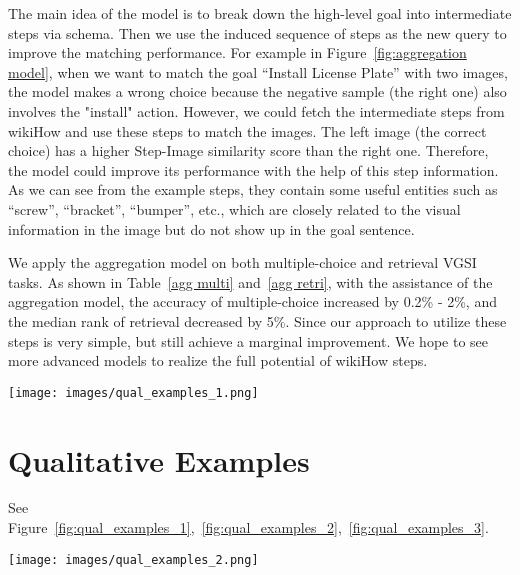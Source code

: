 \documentclass[11pt]{article}
\begin{document}
The main idea of the model is to break down the high-level goal into intermediate steps via schema. Then we use the induced sequence of steps as the new query to improve the matching performance. For example in Figure~\ref{fig:aggregation model}, when we want to match the goal “Install License Plate” with two images, the model makes a wrong choice because the negative sample (the right one) also involves the "install" action. However, we could fetch the intermediate steps from \textcolor{outerspace}{wiki}\textcolor{OLIVINE}{How} and use these steps to match the images. The left image (the correct choice) has a higher Step-Image similarity score than the right one. Therefore, the model could improve its performance with the help of this step information. As we can see from the example steps, they contain some useful entities such as “screw”, “bracket”, “bumper”, etc., which are closely related to the visual information in the image but do not show up in the goal sentence.

We apply the aggregation model on both multiple-choice and retrieval VGSI tasks. As shown in Table~\ref{agg multi} and~\ref{agg retri}, with the assistance of the aggregation model, the accuracy of multiple-choice increased by 0.2\% - 2\%, and the median rank of retrieval decreased by 5\%. Since our approach to utilize these steps is very simple, but still achieve a marginal improvement. We hope to see more advanced models to realize the full potential of wikiHow steps.

\begin{figure*}[!t]
\centering
    \texttt{[image: images/qual\_examples\_1.png]}
    \captionsetup{justification=centering}
    \caption[model]{Qualitative Examples Using Different Sampling Strategies.}
    \label{fig:qual_examples_1}
\end{figure*}


\newpage

\section{Qualitative Examples}

See Figure~\ref{fig:qual_examples_1},~\ref{fig:qual_examples_2},~\ref{fig:qual_examples_3}.
\begin{figure*}[!t]
\centering
    \texttt{[image: images/qual\_examples\_2.png]}
\caption[model]{Qualitative Examples Using Different Query Prompts. (Yellow bounding box is the goal's prediction, blue bounding box denotes the method's prediction, red bounding box denotes the step's prediction, green checkmark represents the ground truth.)}
    \label{fig:qual_examples_2}
\end{figure*}
\end{document}
